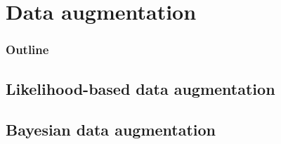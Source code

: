 \documentclass[color=usenames,dvipsnames]{beamer}\usepackage[]{graphicx}\usepackage[]{color}
\begin{document}















\section{Data augmentation}




\begin{frame}
  \frametitle{Outline}
  \Large
  \tableofcontents[currentsection]
\end{frame}


\subsection{Likelihood-based data augmentation}


\subsection{Bayesian data augmentation}








\end{document}
